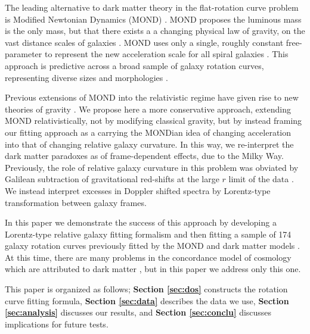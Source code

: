 \documentclass[reprint,%
 amsmath,amssymb,
 aps,
]{revtex4-1}
\begin{document}
  
 
     The leading   alternative    to dark matter theory  in the flat-rotation curve problem is   Modified Newtonian Dynamics (MOND) \cite{Milgrom}.  
     MOND    proposes    the   luminous mass is the only mass, but that there exists a 
     a changing  physical law of gravity,    on the vast distance scales of galaxies \cite{McGaugh_2014}. 
MOND uses only   a single, roughly constant free-parameter to represent the new acceleration scale for all spiral   galaxies  \cite{McGaugh2016RAR,2022A&A...664A..40M}. 
    This approach  is   predictive across a  broad  sample of galaxy rotation curves,  representing diverse    sizes and morphologies \cite{2016Lelli}.  
  
  
  Previous extensions of MOND into the relativistic regime have given rise to  new theories of gravity  \cite{PhysRevD.70.083509,doi:10.1142/S0217751X0703666X,Famaey2012}.  
  We    propose here  a more conservative approach,   extending MOND relativistically, not by modifying classical gravity,  but by instead framing  our fitting approach as a carrying the MONDian idea of changing acceleration into  that of changing relative galaxy curvature. 
 In this way,  we      re-interpret the dark matter paradoxes   as    of  frame-dependent effects,   due to the Milky Way.
   Previously, the role of relative
     galaxy curvature  in this problem was obviated 
       by  Galilean subtraction of   gravitational red-shifts at the  large $r$  limit of the data \citep{MTW}. We instead interpret excesses in Doppler shifted spectra by  Lorentz-type transformation between galaxy frames.
       
       
  In this paper we   demonstrate the success of this approach by developing a Lorentz-type relative galaxy fitting formalism and then fitting   a sample of 174 galaxy rotation curves previously fitted by the MOND and dark matter models  \cite{McGaugh2016RAR,2016Lelli,McGaugh_2014,Li_2018}.  
       At this time, there are many problems in   the concordance model of   cosmology which are attributed to dark matter \cite{2010dmp..book.....S,Tully:2014gfa,Naidu_2022}, but in
 this paper we address only this  one.  
  
 
 
 
This paper  is organized as follows;
{\bf Section \ref{sec:dos}} constructs  the rotation curve  fitting formula, 
{\bf Section \ref{sec:data}}   describes  the data we use, 
 {\bf Section \ref{sec:analysis}}   discusses our results, 
 and  {\bf Section \ref{sec:conclu}}   discusses implications for future tests.   
  
\end{document}
